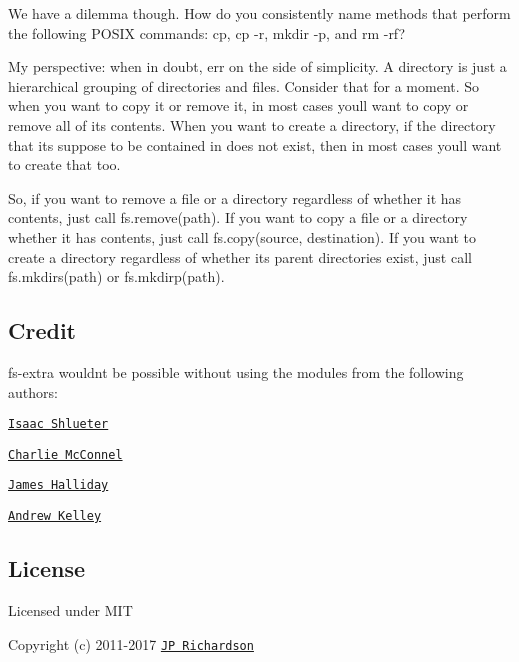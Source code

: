 We have a dilemma though. How do you consistently name methods that perform the following P\+O\+S\+IX commands\+: {\ttfamily cp}, {\ttfamily cp -\/r}, {\ttfamily mkdir -\/p}, and {\ttfamily rm -\/rf}?

My perspective\+: when in doubt, err on the side of simplicity. A directory is just a hierarchical grouping of directories and files. Consider that for a moment. So when you want to copy it or remove it, in most cases you\textquotesingle{}ll want to copy or remove all of its contents. When you want to create a directory, if the directory that it\textquotesingle{}s suppose to be contained in does not exist, then in most cases you\textquotesingle{}ll want to create that too.

So, if you want to remove a file or a directory regardless of whether it has contents, just call {\ttfamily fs.\+remove(path)}. If you want to copy a file or a directory whether it has contents, just call {\ttfamily fs.\+copy(source, destination)}. If you want to create a directory regardless of whether its parent directories exist, just call {\ttfamily fs.\+mkdirs(path)} or {\ttfamily fs.\+mkdirp(path)}.

\subsection*{Credit }

{\ttfamily fs-\/extra} wouldn\textquotesingle{}t be possible without using the modules from the following authors\+:


\begin{DoxyItemize}
\item \href{https://github.com/isaacs}{\tt Isaac Shlueter}
\item \href{https://github.com/avianflu}{\tt Charlie Mc\+Connel}
\item \href{https://github.com/substack}{\tt James Halliday}
\item \href{https://github.com/andrewrk}{\tt Andrew Kelley}
\end{DoxyItemize}

\subsection*{License }

Licensed under M\+IT

Copyright (c) 2011-\/2017 \href{https://github.com/jprichardson}{\tt JP Richardson} 